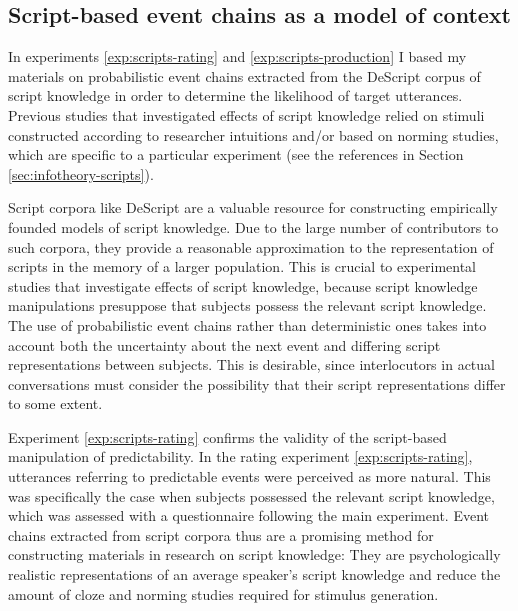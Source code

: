 \subsection{Script-based event chains as a model of context}

In experiments \ref{exp:scripts-rating} and \ref{exp:scripts-production} I based my materials on probabilistic event chains extracted from the DeScript corpus of script knowledge \citep{wanzare.etal2016} in order to determine the likelihood of target utterances. Previous studies that investigated effects of script knowledge relied on stimuli constructed according to researcher intuitions and/or based on norming studies, which are specific to a particular experiment (see the references in Section \ref{sec:infotheory-scripts}).

Script corpora like DeScript \citep{wanzare.etal2016} are a valuable resource for constructing empirically founded models of script knowledge. Due to the large number of contributors to such corpora, they provide a reasonable approximation to the representation of scripts in the memory of a larger population. This is crucial to experimental studies that investigate effects of script knowledge, because script knowledge manipulations presuppose that subjects possess the relevant script knowledge. The use of probabilistic event chains rather than deterministic ones takes into account both the uncertainty about the next event and differing script representations between subjects. This is desirable, since interlocutors in actual conversations must consider the possibility that their script representations differ to some extent.

\newpage
\noindent Experiment \ref{exp:scripts-rating} confirms the validity of the script-based manipulation of predictability. In the rating experiment \ref{exp:scripts-rating}, utterances referring to predictable events were perceived as more natural. This was specifically the case when subjects possessed the relevant script knowledge, which was assessed with a questionnaire following the main experiment. Event chains extracted from script corpora thus are a promising method for constructing materials in research on script knowledge: They are psychologically realistic representations of an average speaker's script knowledge and reduce the amount of cloze and norming studies required for stimulus generation.

